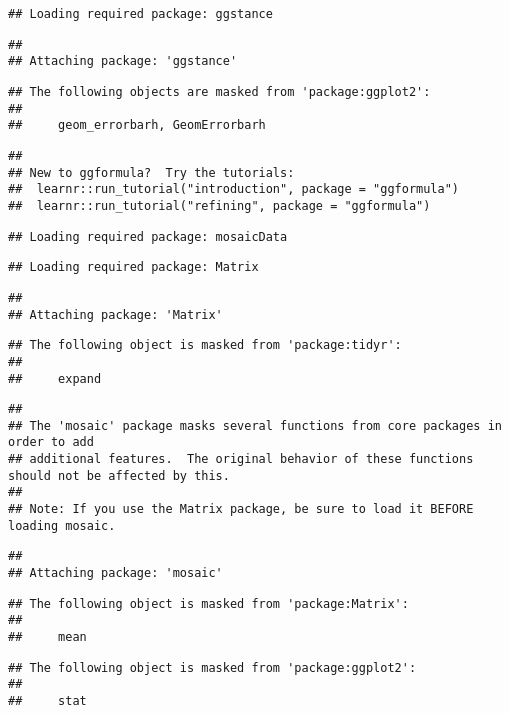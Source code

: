 \documentclass[]{article}
\begin{document}
\begin{verbatim}
## Loading required package: ggstance
\end{verbatim}

\begin{verbatim}
## 
## Attaching package: 'ggstance'
\end{verbatim}

\begin{verbatim}
## The following objects are masked from 'package:ggplot2':
## 
##     geom_errorbarh, GeomErrorbarh
\end{verbatim}

\begin{verbatim}
## 
## New to ggformula?  Try the tutorials: 
##  learnr::run_tutorial("introduction", package = "ggformula")
##  learnr::run_tutorial("refining", package = "ggformula")
\end{verbatim}

\begin{verbatim}
## Loading required package: mosaicData
\end{verbatim}

\begin{verbatim}
## Loading required package: Matrix
\end{verbatim}

\begin{verbatim}
## 
## Attaching package: 'Matrix'
\end{verbatim}

\begin{verbatim}
## The following object is masked from 'package:tidyr':
## 
##     expand
\end{verbatim}

\begin{verbatim}
## 
## The 'mosaic' package masks several functions from core packages in order to add 
## additional features.  The original behavior of these functions should not be affected by this.
## 
## Note: If you use the Matrix package, be sure to load it BEFORE loading mosaic.
\end{verbatim}

\begin{verbatim}
## 
## Attaching package: 'mosaic'
\end{verbatim}

\begin{verbatim}
## The following object is masked from 'package:Matrix':
## 
##     mean
\end{verbatim}

\begin{verbatim}
## The following object is masked from 'package:ggplot2':
## 
##     stat
\end{verbatim}
\end{document}
